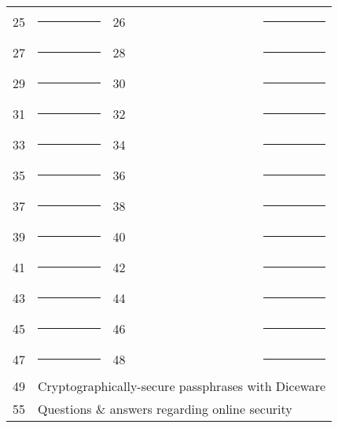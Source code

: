 \begin{center}
	
\begin{tabular}{l l l l }
	25 & \rule{1.75in}{.2pt} & 26 & \rule{1.75in}{.2pt} \vspace{.225in} \\
	27 & \rule{1.75in}{.2pt} & 28 & \rule{1.75in}{.2pt} \vspace{.225in} \\
	29 & \rule{1.75in}{.2pt} & 30 & \rule{1.75in}{.2pt} \vspace{.225in} \\
	31 & \rule{1.75in}{.2pt} & 32 & \rule{1.75in}{.2pt} \vspace{.225in} \\
	33 & \rule{1.75in}{.2pt} & 34 & \rule{1.75in}{.2pt} \vspace{.225in} \\
	35 & \rule{1.75in}{.2pt} & 36 & \rule{1.75in}{.2pt} \vspace{.225in} \\
	37 & \rule{1.75in}{.2pt} & 38 & \rule{1.75in}{.2pt} \vspace{.225in} \\
	39 & \rule{1.75in}{.2pt} & 40 & \rule{1.75in}{.2pt} \vspace{.225in} \\
	41 & \rule{1.75in}{.2pt} & 42 & \rule{1.75in}{.2pt} \vspace{.225in} \\
	43 & \rule{1.75in}{.2pt} & 44 & \rule{1.75in}{.2pt} \vspace{.225in} \\
	45 & \rule{1.75in}{.2pt} & 46 & \rule{1.75in}{.2pt} \vspace{.225in} \\
	47 & \rule{1.75in}{.2pt} & 48 & \rule{1.75in}{.2pt} \vspace{.275in} \\
	49 & \multicolumn{3}{l}{Cryptographically-secure passphrases with Diceware} \vspace{.275in} \\
	55 & \multicolumn{3}{l}{Questions \& answers regarding online security} \\
\end{tabular}
	
\end{center}

